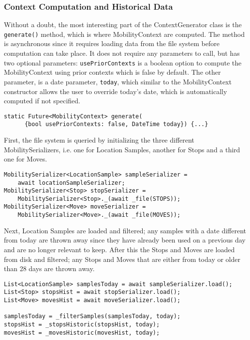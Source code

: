 \subsubsection{Context Computation and Historical Data}
Without a doubt, the most interesting part of the ContextGenerator class is the \verb|generate()| method, which is where MobilityContext are computed. The method is asynchronous since it requires loading data from the file system before computation can take place. It does not require any parameters to call, but has two optional parameters: \verb|usePriorContexts| is a boolean option to compute the MobilityContext using prior contexts which is false by default. The other parameter, is a date parameter, \verb|today|, which similar to the MobilityContext constructor allows the user to override today's date, which is automatically computed if not specified.

\begin{verbatim}
static Future<MobilityContext> generate(
      {bool usePriorContexts: false, DateTime today}) {...}
\end{verbatim}

First, the file system is queried by initializing the three different MobilitySerializers, i.e. one for Location Samples, another for Stops and a third one for Moves. 
\begin{verbatim}
MobilitySerializer<LocationSample> sampleSerializer =
    await locationSampleSerializer;
MobilitySerializer<Stop> stopSerializer =
    MobilitySerializer<Stop>._(await _file(STOPS));
MobilitySerializer<Move> moveSerializer =
    MobilitySerializer<Move>._(await _file(MOVES));
\end{verbatim}

Next, Location Samples are loaded and filtered; any samples with a date different from today are thrown away since they have already been used on a previous day and are no longer relevant to keep. After this the Stops and Moves are loaded from disk and filtered; any Stops and Moves that are either from today or older than 28 days are thrown away.

\begin{verbatim}
List<LocationSample> samplesToday = await sampleSerializer.load();
List<Stop> stopsHist = await stopSerializer.load();
List<Move> movesHist = await moveSerializer.load();

samplesToday = _filterSamples(samplesToday, today);
stopsHist = _stopsHistoric(stopsHist, today);
movesHist = _movesHistoric(movesHist, today);
\end{verbatim}

